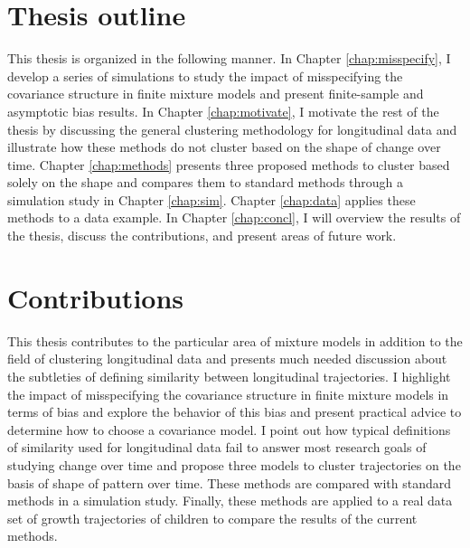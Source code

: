 \section{Thesis outline}
This thesis is organized in the following manner. In Chapter \ref{chap:misspecify}, I develop a series of simulations to study the impact of misspecifying the covariance structure in finite mixture models and present finite-sample and asymptotic bias results. In Chapter \ref{chap:motivate}, I motivate the rest of the thesis by discussing the general clustering methodology for longitudinal data and illustrate how these methods do not cluster based on the shape of change over time. Chapter \ref{chap:methods} presents three proposed methods to cluster based solely on the shape and compares them to standard methods through a simulation study in Chapter \ref{chap:sim}. Chapter \ref{chap:data} applies these methods to a data example. In Chapter \ref{chap:concl}, I will overview the results of the thesis, discuss the contributions, and present areas of future work. 

\section{Contributions}
This thesis contributes to the particular area of mixture models in addition to the field of clustering longitudinal data and presents much needed discussion about the subtleties of defining similarity between longitudinal trajectories. I highlight the impact of misspecifying the covariance structure in finite mixture models in terms of bias and explore the behavior of this bias and present practical advice to determine how to choose a covariance model. I point out how typical definitions of similarity used for longitudinal data fail to answer most research goals of studying change over time and propose three models to cluster trajectories on the basis of shape of pattern over time. These methods are compared with standard methods in a simulation study. Finally, these methods are applied to a real data set of growth trajectories of children to compare the results of the current methods. 

